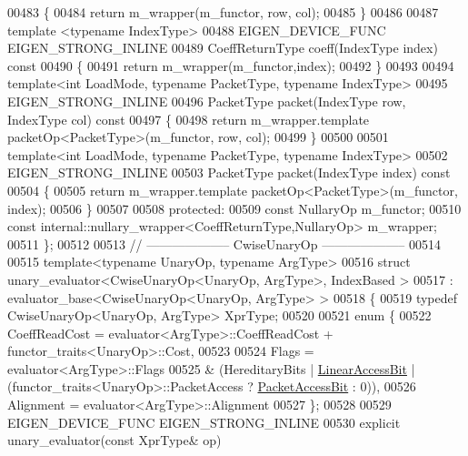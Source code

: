 \begin{DoxyCode}
00483 \textcolor{keyword}{  }\{
00484     \textcolor{keywordflow}{return} m\_wrapper(m\_functor, row, col);
00485   \}
00486 
00487   \textcolor{keyword}{template} <\textcolor{keyword}{typename} IndexType>
00488   EIGEN\_DEVICE\_FUNC EIGEN\_STRONG\_INLINE
00489   CoeffReturnType coeff(IndexType index)\textcolor{keyword}{ const}
00490 \textcolor{keyword}{  }\{
00491     \textcolor{keywordflow}{return} m\_wrapper(m\_functor,index);
00492   \}
00493 
00494   \textcolor{keyword}{template}<\textcolor{keywordtype}{int} LoadMode, \textcolor{keyword}{typename} PacketType, \textcolor{keyword}{typename} IndexType>
00495   EIGEN\_STRONG\_INLINE
00496   PacketType packet(IndexType row, IndexType col)\textcolor{keyword}{ const}
00497 \textcolor{keyword}{  }\{
00498     \textcolor{keywordflow}{return} m\_wrapper.template packetOp<PacketType>(m\_functor, row, col);
00499   \}
00500 
00501   \textcolor{keyword}{template}<\textcolor{keywordtype}{int} LoadMode, \textcolor{keyword}{typename} PacketType, \textcolor{keyword}{typename} IndexType>
00502   EIGEN\_STRONG\_INLINE
00503   PacketType packet(IndexType index)\textcolor{keyword}{ const}
00504 \textcolor{keyword}{  }\{
00505     \textcolor{keywordflow}{return} m\_wrapper.template packetOp<PacketType>(m\_functor, index);
00506   \}
00507 
00508 \textcolor{keyword}{protected}:
00509   \textcolor{keyword}{const} NullaryOp m\_functor;
00510   \textcolor{keyword}{const} internal::nullary\_wrapper<CoeffReturnType,NullaryOp> m\_wrapper;
00511 \};
00512 
00513 \textcolor{comment}{// -------------------- CwiseUnaryOp --------------------}
00514 
00515 \textcolor{keyword}{template}<\textcolor{keyword}{typename} UnaryOp, \textcolor{keyword}{typename} ArgType>
00516 \textcolor{keyword}{struct }unary\_evaluator<CwiseUnaryOp<UnaryOp, ArgType>, IndexBased >
00517   : evaluator\_base<CwiseUnaryOp<UnaryOp, ArgType> >
00518 \{
00519   \textcolor{keyword}{typedef} CwiseUnaryOp<UnaryOp, ArgType> XprType;
00520   
00521   \textcolor{keyword}{enum} \{
00522     CoeffReadCost = evaluator<ArgType>::CoeffReadCost + functor\_traits<UnaryOp>::Cost,
00523     
00524     Flags = evaluator<ArgType>::Flags
00525           & (HereditaryBits | \hyperlink{group__flags_ga4b983a15d57cd55806df618ac544d09e}{LinearAccessBit} | (functor\_traits<UnaryOp>::PacketAccess ? 
      \hyperlink{group__flags_ga1a306a438e1ab074e8be59512e887b9f}{PacketAccessBit} : 0)),
00526     Alignment = evaluator<ArgType>::Alignment
00527   \};
00528 
00529   EIGEN\_DEVICE\_FUNC EIGEN\_STRONG\_INLINE
00530   \textcolor{keyword}{explicit} unary\_evaluator(\textcolor{keyword}{const} XprType& op)

\end{DoxyCode}
